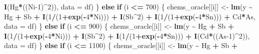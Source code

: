 \documentclass[12pt, twoside]{amherstthesis}
\newenvironment{Shaded}{\begin{snugshade}}{\end{snugshade}}
\newcommand{\AttributeTok}[1]{\textcolor[rgb]{0.13,0.29,0.53}{#1}}
\newcommand{\ControlFlowTok}[1]{\textcolor[rgb]{0.13,0.29,0.53}{\textbf{#1}}}
\newcommand{\DecValTok}[1]{\textcolor[rgb]{0.00,0.00,0.81}{#1}}
\newcommand{\FunctionTok}[1]{\textcolor[rgb]{0.13,0.29,0.53}{\textbf{#1}}}
\newcommand{\NormalTok}[1]{#1}
\newcommand{\OtherTok}[1]{\textcolor[rgb]{0.56,0.35,0.01}{#1}}
\newcommand{\SpecialCharTok}[1]{\textcolor[rgb]{0.81,0.36,0.00}{\textbf{#1}}}
\begin{document}
\begin{Shaded}
\begin{Highlighting}[]
                                \FunctionTok{I}\NormalTok{(Hg}\SpecialCharTok{*}\NormalTok{((Ni}\DecValTok{{-}1}\NormalTok{)}\SpecialCharTok{\^{}}\DecValTok{2}\NormalTok{)), }\AttributeTok{data =}\NormalTok{ df)}
\NormalTok{    \} }\ControlFlowTok{else} \ControlFlowTok{if}\NormalTok{ (i }\SpecialCharTok{\textless{}=} \DecValTok{700}\NormalTok{) \{}
\NormalTok{      chems\_oracle[[i]] }\OtherTok{\textless{}{-}} \FunctionTok{lm}\NormalTok{(y }\SpecialCharTok{\textasciitilde{}}\NormalTok{ Hg }\SpecialCharTok{+}\NormalTok{ Sb }\SpecialCharTok{+}
                                \FunctionTok{I}\NormalTok{(}\DecValTok{1}\SpecialCharTok{/}\NormalTok{(}\DecValTok{1}\SpecialCharTok{+}\FunctionTok{exp}\NormalTok{(}\SpecialCharTok{{-}}\DecValTok{4}\SpecialCharTok{*}\NormalTok{Ni))) }\SpecialCharTok{+} \FunctionTok{I}\NormalTok{(Sb}\SpecialCharTok{\^{}}\DecValTok{2}\NormalTok{) }\SpecialCharTok{+} \FunctionTok{I}\NormalTok{(}\DecValTok{1}\SpecialCharTok{/}\NormalTok{(}\DecValTok{1}\SpecialCharTok{+}\FunctionTok{exp}\NormalTok{(}\SpecialCharTok{{-}}\DecValTok{4}\SpecialCharTok{*}\NormalTok{Sn))) }\SpecialCharTok{+}
\NormalTok{                                Cd}\SpecialCharTok{*}\NormalTok{As, }\AttributeTok{data =}\NormalTok{ df)}
\NormalTok{    \} }\ControlFlowTok{else} \ControlFlowTok{if}\NormalTok{ (i }\SpecialCharTok{\textless{}=} \DecValTok{900}\NormalTok{) \{}
\NormalTok{      chems\_oracle[[i]] }\OtherTok{\textless{}{-}} \FunctionTok{lm}\NormalTok{(y }\SpecialCharTok{\textasciitilde{}}\NormalTok{ Hg }\SpecialCharTok{+}\NormalTok{ Sb }\SpecialCharTok{+}
                                \FunctionTok{I}\NormalTok{(}\DecValTok{1}\SpecialCharTok{/}\NormalTok{(}\DecValTok{1}\SpecialCharTok{+}\FunctionTok{exp}\NormalTok{(}\SpecialCharTok{{-}}\DecValTok{4}\SpecialCharTok{*}\NormalTok{Ni))) }\SpecialCharTok{+} \FunctionTok{I}\NormalTok{(Sb}\SpecialCharTok{\^{}}\DecValTok{2}\NormalTok{) }\SpecialCharTok{+} \FunctionTok{I}\NormalTok{(}\DecValTok{1}\SpecialCharTok{/}\NormalTok{(}\DecValTok{1}\SpecialCharTok{+}\FunctionTok{exp}\NormalTok{(}\SpecialCharTok{{-}}\DecValTok{4}\SpecialCharTok{*}\NormalTok{Sn))) }\SpecialCharTok{+}
                                \FunctionTok{I}\NormalTok{(Cd}\SpecialCharTok{*}\NormalTok{((As}\DecValTok{{-}1}\NormalTok{)}\SpecialCharTok{\^{}}\DecValTok{2}\NormalTok{)), }\AttributeTok{data =}\NormalTok{ df)}
\NormalTok{    \} }\ControlFlowTok{else} \ControlFlowTok{if}\NormalTok{ (i }\SpecialCharTok{\textless{}=} \DecValTok{1100}\NormalTok{) \{}
\NormalTok{      chems\_oracle[[i]] }\OtherTok{\textless{}{-}} \FunctionTok{lm}\NormalTok{(y }\SpecialCharTok{\textasciitilde{}}\NormalTok{ Hg }\SpecialCharTok{+}\NormalTok{ Sb }\SpecialCharTok{+}

\end{Highlighting}
\end{Shaded}
\end{document}
